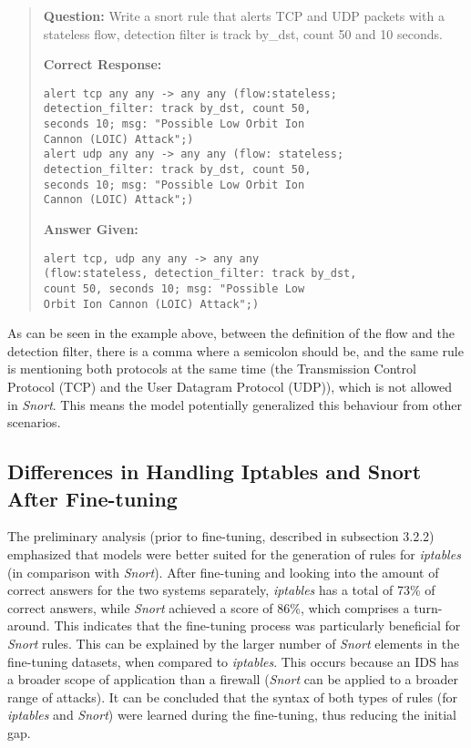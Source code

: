 \documentclass[sigconf]{acmart}
\begin{document}
\begin{quote}
\textbf{Question:} Write a snort rule that alerts TCP and UDP packets with a stateless flow, detection filter is track by\_dst, count 50 and 10 seconds.

\textbf{Correct Response:}
\begin{verbatim}
alert tcp any any -> any any (flow:stateless; 
detection_filter: track by_dst, count 50, 
seconds 10; msg: "Possible Low Orbit Ion 
Cannon (LOIC) Attack";) 
alert udp any any -> any any (flow: stateless; 
detection_filter: track by_dst, count 50, 
seconds 10; msg: "Possible Low Orbit Ion 
Cannon (LOIC) Attack";)
\end{verbatim}

\textbf{Answer Given:}
\begin{verbatim}
alert tcp, udp any any -> any any 
(flow:stateless, detection_filter: track by_dst,
count 50, seconds 10; msg: "Possible Low 
Orbit Ion Cannon (LOIC) Attack";)
\end{verbatim}
\end{quote}
As can be seen in the example above, between the definition of the flow and the detection filter, there is a comma where a semicolon should be, and the same rule is mentioning both protocols at the same time (the Transmission Control Protocol (TCP) and the User Datagram Protocol (UDP)), which is not allowed in \textit{Snort}. This means the model potentially generalized this behaviour from other scenarios.

\subsection{Differences in Handling Iptables and Snort After Fine-tuning}
The preliminary analysis (prior to fine-tuning, described in subsection 3.2.2) emphasized that models were better suited for the generation of rules for \textit{iptables} (in comparison with \textit{Snort}). After fine-tuning and looking into the amount of correct answers for the two systems separately, \textit{iptables} has a total of 73\% of correct answers, while \textit{Snort} achieved a score of 86\%, which comprises a turn-around. This indicates that the fine-tuning process was particularly beneficial for \textit{Snort} rules. This can be explained by the larger number of \textit{Snort} elements in the fine-tuning datasets, when compared to \textit{iptables}. This occurs because an IDS has a broader scope of application than a firewall (\textit{Snort} can be applied to a broader range of attacks). It can be concluded that the syntax of both types of rules (for \textit{iptables} and \textit{Snort}) were learned during the fine-tuning, thus reducing the initial gap.
\end{document}
